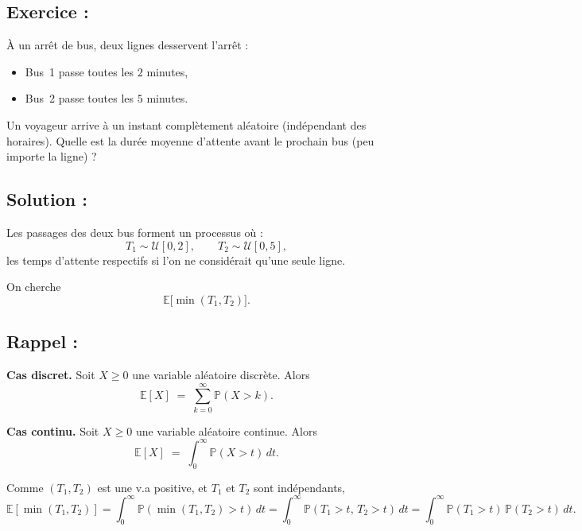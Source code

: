 \subsection*{Exercice :}

\begin{exerciseBox}
À un arrêt de bus, deux lignes desservent l'arrêt :
\begin{itemize}
  \item Bus~1 passe toutes les $2$ minutes,
  \item Bus~2 passe toutes les $5$ minutes.
\end{itemize}
Un voyageur arrive à un instant complètement aléatoire (indépendant des horaires).  
Quelle est la durée moyenne d'attente avant le prochain bus (peu importe la ligne) ?
\end{exerciseBox}

\subsection*{Solution :}

Les passages des deux bus forment un processus où :
\[
T_1 \sim \mathcal{U}[0,2], \qquad
T_2 \sim \mathcal{U}[0,5],
\]
les temps d'attente respectifs si l’on ne considérait qu’une seule ligne.

On cherche
\[
\mathbb{E}\big[\min(T_1,T_2)\big].
\]

\subsection*{Rappel :}

\begin{rappelBox}
\textbf{Cas discret.}  
Soit $X \geq 0$ une variable aléatoire discrète. Alors
\[
\mathbb{E}[X] \;=\; \sum_{k=0}^{\infty} \mathbb{P}(X > k).
\]

\textbf{Cas continu.}  
Soit $X \geq 0$ une variable aléatoire continue. Alors
\[
\mathbb{E}[X] \;=\; \int_{0}^{\infty} \mathbb{P}(X > t)\, dt.
\]
\end{rappelBox}



Comme  $(T_1 , T_2)$ est une v.a positive, et $T_1$ et $T_2$ sont indépendants,
\[
\mathbb{E}[\min(T_1,T_2)]
= \int_{0}^{\infty} \mathbb{P}(\min(T_1 , T_2)>t)\, dt
= \int_{0}^{\infty} \mathbb{P}(T_1>t,\,T_2>t)\, dt
= \int_{0}^{\infty} \mathbb{P}(T_1>t)\,\mathbb{P}(T_2>t)\, dt.
\]

